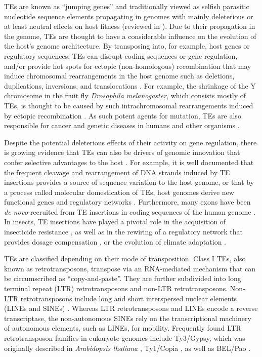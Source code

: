 TEs are known as ``jumping genes'' and traditionally viewed as selfish
parasitic nucleotide sequence elements propagating in genomes with
mainly deleterious or at least neutral effects on host fitness
\citep{Mackay1989, Pasyukova2004} (reviewed in \citet{Barron2014}). Due
to their propagation in the genome, TEs are thought to have a
considerable influence on the evolution of the host's genome
architecture. By transposing into, for example, host genes or regulatory
sequences, TEs can disrupt coding sequences or gene regulation, and/or
provide hot spots for ectopic (non-homologous) recombination that may
induce chromosomal rearrangements in the host genome such as deletions,
duplications, inversions, and translocations \citep{Burns2012}. For
example, the shrinkage of the Y chromosome in the fruit fly
\emph{Drosophila melanogaster}, which consists mostly of TEs, is thought
to be caused by such intrachromosomal rearrangements induced by ectopic
recombination \citep{Adams2000, Kent2017}. As such potent agents for
mutation, TEs are also responsible for cancer and genetic diseases in
humans and other organisms
\citep{Vorechovsky2009,Chenais2015,Hancks2016}.

Despite the potential deleterious effects of their activity on gene
regulation, there is growing evidence that TEs can also be drivers of
genomic innovation that confer selective advantages to the host
\citep{Casola2007,Gonzalez2008}. For example, it is well documented that
the frequent cleavage and rearrangement of DNA strands induced by TE
insertions provides a source of sequence variation to the host genome,
or that by a process called molecular domestication of TEs, host genomes
derive new functional genes and regulatory networks
\citep{Feschotte2008,Bohne2008,Santos2014}.  Furthermore, many exons
have been \emph{de novo}-recruited from TE insertions in coding
sequences of the human genome \citep{Zhang2006}.  In insects, TE
insertions have played a pivotal role in the acquisition of insecticide
resistance \citep{Chen2007,Itokawa2010,Gahan2001}, as well as in the
rewiring of a regulatory network that provides dosage compensation
\citep{Ellison2013}, or the evolution of climate adaptation
\citep{Gonzalez2010,Kim2014}.

TEs are classified depending on their mode of transposition. Class I
TEs, also known as retrotransposons, transpose via an RNA-mediated
mechanism that can be circumscribed as ``copy-and-paste''. They are
further subdivided into long terminal repeat (LTR) retrotransposons and
non-LTR retrotransposons. Non-LTR retrotransposons include long and
short interspersed nuclear elements (LINEs and SINEs)
\citep{Malik1999,Eickbush2008}. Whereas LTR retrotransposons and LINEs
encode a reverse transcriptase, the non-autonomous SINEs rely on the
transcriptional machinery of autonomous elements, such as LINEs, for
mobility. Frequently found LTR retrotransposon families in eukaryote
genomes include Ty3/Gypsy, which was originally described in
\emph{Arabidopsis thaliana} \citep{Marin2000}, Ty1/Copia
\citep{Flavell1992}, as well as BEL/Pao \citep{delaChaux2011}.

